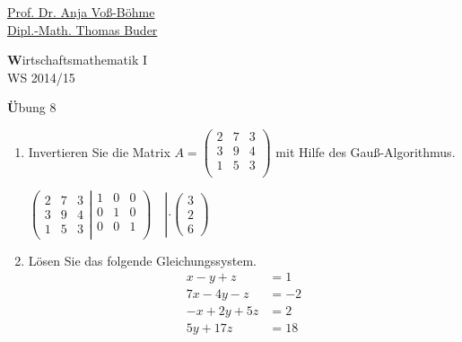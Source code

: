 \documentclass[12pt,a4paper]{scrreprt}
\newcommand{\Lsg}{\textbf{Lsg.:}}
\begin{document}
 
\begin{flushleft}
\href{mailto:anja.voss-boehme@htw-dresden.de}{Prof. Dr. Anja Voß-Böhme} \\
\href{mailto:buder@htw-dresden.de}{Dipl.-Math. Thomas Buder}
\end{flushleft}

\begin{center}{\large\textbf Wirtschaftsmathematik I} \\ WS 2014/15 \end{center}

\begin{center}{\large\textbf Übung 8 } 
\end{center}


\bigskip
\begin{enumerate}
	\item Invertieren Sie die Matrix
$A=\begin{pmatrix}
 2 & 7 & 3\\
 3 & 9 & 4 \\
 1 & 5 & 3\\
\end{pmatrix}$ mit Hilfe des Gauß-Algorithmus.

$
\left(
\begin{matrix}
 2 & 7 & 3 \\
 3 & 9 & 4  \\
 1 & 5 & 3  
\end{matrix}
\left|
\begin{matrix}
1 & 0 & 0 \\
0 & 1 & 0 \\
0 & 0 & 1 \\
\end{matrix}
\right)
\right.
\hspace{1em} \left|\cdot\begin{pmatrix} 3 \\ 2 \\ 6 \end{pmatrix}\right.
$

	\item Lösen Sie das folgende Gleichungssystem.\begin{align*}
x - y +  z &= 1 \\
7x - 4y - z &= -2\\
-x + 2y + 5z &= 2\\
5y + 17z &= 18
\end{align*}


\end{enumerate}
\end{document}

